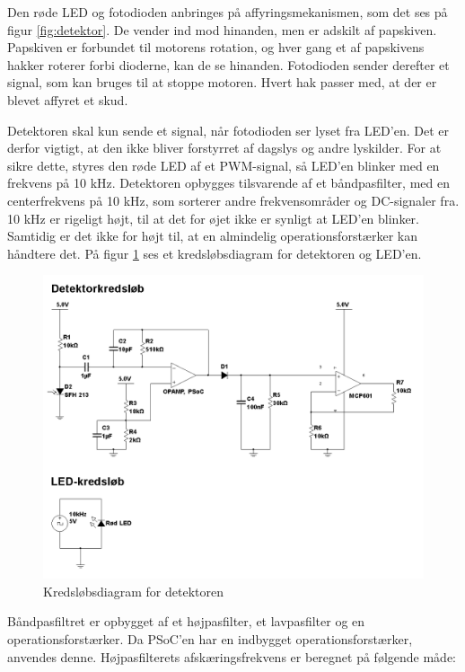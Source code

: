 Den røde LED og fotodioden anbringes på affyringsmekanismen, som det ses på figur \ref{fig:detektor}. De vender ind mod hinanden, men er adskilt af papskiven. Papskiven er forbundet til motorens rotation, og hver gang et af papskivens hakker roterer forbi dioderne, kan de se hinanden. Fotodioden sender derefter et signal, som kan bruges til at stoppe motoren. Hvert hak passer med, at der er blevet affyret et skud.  

Detektoren skal kun sende et signal, når fotodioden ser lyset fra LED'en. Det er derfor vigtigt, at den ikke bliver forstyrret af dagslys og andre lyskilder. For at sikre dette, styres den røde LED af et PWM-signal, så LED'en blinker med en frekvens på 10 kHz. Detektoren opbygges tilsvarende af et båndpasfilter, med en centerfrekvens på 10 kHz, som sorterer andre frekvensområder og DC-signaler fra. 10 kHz er rigeligt højt, til at det for øjet ikke er synligt at LED'en blinker. Samtidig er det ikke for højt til, at en almindelig operationsforstærker kan håndtere det. På figur \ref*{fig:detektortand} ses et kredsløbsdiagram for detektoren og LED'en.

\begin{figure}[H]
	\centering
	\includegraphics[width=\textwidth]{Afsnit/DesignOgImplementering/images/detektor_tandhjul}
	\caption{Kredsløbsdiagram for detektoren}
	\label{fig:detektortand}
\end{figure}

Båndpasfiltret er opbygget af et højpasfilter, et lavpasfilter og en operationsforstærker. Da PSoC'en har en indbygget operationsforstærker, anvendes denne. Højpasfilterets afskæringsfrekvens er beregnet på følgende måde: \\

